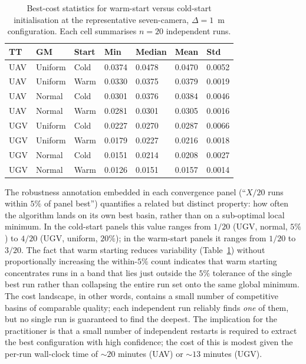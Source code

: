 \begin{table}[htbp]
\centering
\caption[Best-cost statistics for warm- vs cold-start runs, $k=7$, $\Delta=1$~m.]{Best-cost statistics for warm-start versus cold-start initialisation at the representative seven-camera, $\Delta=1$~m configuration. Each cell summarises $n=20$ independent runs.}
\label{tab:warm-vs-cold}
\small
\begin{tabular}{l l l l l l l}
\toprule
TT & GM & Start & Min & Median & Mean & Std \\
\midrule
UAV & Uniform & Cold & 0.0374 & 0.0478 & 0.0470 & 0.0052 \\
UAV & Uniform & Warm & 0.0330 & 0.0375 & 0.0379 & 0.0019 \\
UAV & Normal  & Cold & 0.0301 & 0.0376 & 0.0384 & 0.0046 \\
UAV & Normal  & Warm & 0.0281 & 0.0301 & 0.0305 & 0.0016 \\
UGV & Uniform & Cold & 0.0227 & 0.0270 & 0.0287 & 0.0066 \\
UGV & Uniform & Warm & 0.0179 & 0.0227 & 0.0216 & 0.0018 \\
UGV & Normal  & Cold & 0.0151 & 0.0214 & 0.0208 & 0.0027 \\
UGV & Normal  & Warm & 0.0126 & 0.0151 & 0.0157 & 0.0014 \\
\bottomrule
\end{tabular}
\end{table}

The robustness annotation embedded in each convergence panel (``$X/20$ runs within $5\%$ of panel best'') quantifies a related but distinct property: how often the algorithm lands on its own best basin, rather than on a sub-optimal local minimum. In the cold-start panels this value ranges from $1/20$ (UGV, normal, $5\%$) to $4/20$ (UGV, uniform, $20\%$); in the warm-start panels it ranges from $1/20$ to $3/20$. The fact that warm starting reduces variability (Table~\ref{tab:warm-vs-cold}) without proportionally increasing the within-$5\%$ count indicates that warm starting concentrates runs in a band that lies just outside the $5\%$ tolerance of the single best run rather than collapsing the entire run set onto the same global minimum. The cost landscape, in other words, contains a small number of competitive basins of comparable quality; each independent run reliably finds \emph{one} of them, but no single run is guaranteed to find the deepest. The implication for the practitioner is that a small number of independent restarts is required to extract the best configuration with high confidence; the cost of this is modest given the per-run wall-clock time of $\sim 20$ minutes (UAV) or $\sim 13$ minutes (UGV).

